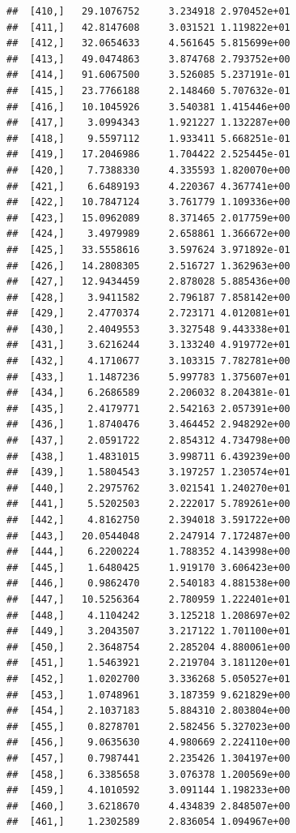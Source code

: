 \documentclass[article]{jss}\usepackage[]{graphicx}\usepackage[]{xcolor}
\makeatletter
\newenvironment{kframe}{%
 \def\at@end@of@kframe{}%
 \ifinner\ifhmode%
  \def\at@end@of@kframe{\end{minipage}}%
  \begin{minipage}{\columnwidth}%
 \fi\fi%
 \def\FrameCommand##1{\hskip\@totalleftmargin \hskip-\fboxsep
 \colorbox{shadecolor}{##1}\hskip-\fboxsep
     \hskip-\linewidth \hskip-\@totalleftmargin \hskip\columnwidth}%
 \MakeFramed {\advance\hsize-\width
   \@totalleftmargin\z@ \linewidth\hsize
   \@setminipage}}%
 {\par\unskip\endMakeFramed%
 \at@end@of@kframe}
\newenvironment{knitrout}{}{} %
\makeatother
\begin{document}
\begin{knitrout}
\begin{kframe}
\begin{verbatim}
##  [410,]   29.1076752     3.234918 2.970452e+01
##  [411,]   42.8147608     3.031521 1.119822e+01
##  [412,]   32.0654633     4.561645 5.815699e+00
##  [413,]   49.0474863     3.874768 2.793752e+00
##  [414,]   91.6067500     3.526085 5.237191e-01
##  [415,]   23.7766188     2.148460 5.707632e-01
##  [416,]   10.1045926     3.540381 1.415446e+00
##  [417,]    3.0994343     1.921227 1.132287e+00
##  [418,]    9.5597112     1.933411 5.668251e-01
##  [419,]   17.2046986     1.704422 2.525445e-01
##  [420,]    7.7388330     4.335593 1.820070e+00
##  [421,]    6.6489193     4.220367 4.367741e+00
##  [422,]   10.7847124     3.761779 1.109336e+00
##  [423,]   15.0962089     8.371465 2.017759e+00
##  [424,]    3.4979989     2.658861 1.366672e+00
##  [425,]   33.5558616     3.597624 3.971892e-01
##  [426,]   14.2808305     2.516727 1.362963e+00
##  [427,]   12.9434459     2.878028 5.885436e+00
##  [428,]    3.9411582     2.796187 7.858142e+00
##  [429,]    2.4770374     2.723171 4.012081e+01
##  [430,]    2.4049553     3.327548 9.443338e+01
##  [431,]    3.6216244     3.133240 4.919772e+01
##  [432,]    4.1710677     3.103315 7.782781e+00
##  [433,]    1.1487236     5.997783 1.375607e+01
##  [434,]    6.2686589     2.206032 8.204381e-01
##  [435,]    2.4179771     2.542163 2.057391e+00
##  [436,]    1.8740476     3.464452 2.948292e+00
##  [437,]    2.0591722     2.854312 4.734798e+00
##  [438,]    1.4831015     3.998711 6.439239e+00
##  [439,]    1.5804543     3.197257 1.230574e+01
##  [440,]    2.2975762     3.021541 1.240270e+01
##  [441,]    5.5202503     2.222017 5.789261e+00
##  [442,]    4.8162750     2.394018 3.591722e+00
##  [443,]   20.0544048     2.247914 7.172487e+00
##  [444,]    6.2200224     1.788352 4.143998e+00
##  [445,]    1.6480425     1.919170 3.606423e+00
##  [446,]    0.9862470     2.540183 4.881538e+00
##  [447,]   10.5256364     2.780959 1.222401e+01
##  [448,]    4.1104242     3.125218 1.208697e+02
##  [449,]    3.2043507     3.217122 1.701100e+01
##  [450,]    2.3648754     2.285204 4.880061e+00
##  [451,]    1.5463921     2.219704 3.181120e+01
##  [452,]    1.0202700     3.336268 5.050527e+01
##  [453,]    1.0748961     3.187359 9.621829e+00
##  [454,]    2.1037183     5.884310 2.803804e+00
##  [455,]    0.8278701     2.582456 5.327023e+00
##  [456,]    9.0635630     4.980669 2.224110e+00
##  [457,]    0.7987441     2.235426 1.304197e+00
##  [458,]    6.3385658     3.076378 1.200569e+00
##  [459,]    4.1010592     3.091144 1.198233e+00
##  [460,]    3.6218670     4.434839 2.848507e+00
##  [461,]    1.2302589     2.836054 1.094967e+00

\end{verbatim}
\end{kframe}
\end{knitrout}
\end{document}
